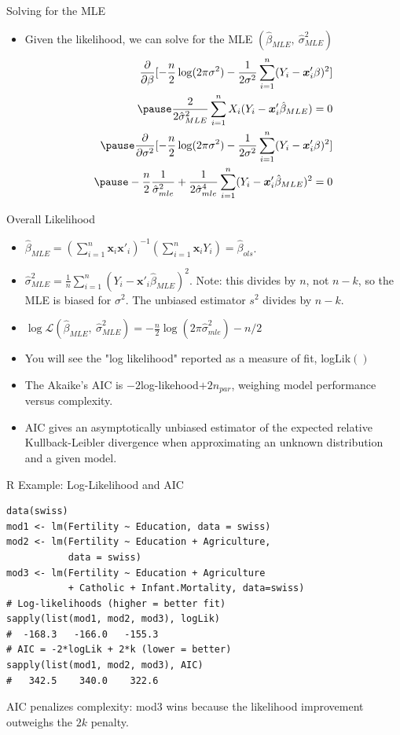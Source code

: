\documentclass[aspectratio=169, handout, t]{beamer}
\numberwithin{equation}{section}
\begin{document}
\begin{frame}{Solving for the MLE}
\begin{itemize}
\item Given the likelihood, we can solve for the MLE $(\hat{\beta}_{MLE},\ \hat{\sigma}^2_{MLE})$
\begin{align*}
\frac{\partial}{\partial \beta}[-\frac{n}{2}\log(2\pi\sigma^2)-\frac{1}{2\sigma^2}\sum_{i=1}^n(Y_i-\bm{x}_i'\beta)^2]\\\pause
\frac{2}{2\hat{\sigma}_{MLE}^2}\sum_{i=1}^nX_i(Y_i-\bm{x}_i'\hat{\beta}_{MLE})=0\\\pause
\frac{\partial}{\partial \sigma^2}[-\frac{n}{2}\log(2\pi\sigma^2)-\frac{1}{2\sigma^2}\sum_{i=1}^n(Y_i-\bm{x}_i'\beta)^2]\\\pause
-\frac{n}{2}\frac{1}{\hat{\sigma}_{mle}^2}+\frac{1}{2\hat{\sigma}_{mle}^4}\sum_{i=1}^n(Y_i-\bm{x}_i'\hat{\beta}_{MLE})^2=0
\end{align*}
\end{itemize}
\end{frame}

\begin{frame}{Overall Likelihood}
\begin{itemize}
\item $\hat{\beta}_{MLE}=(\sum_{i=1}^n\bm{x}_i\bm{x}'_i)^{-1}(\sum_{i=1}^n\bm{x}_iY_i)=\hat{\beta}_{ols}$.\pause
\item $\hat{\sigma}^2_{MLE}=\frac{1}{n}\sum_{i=1}^n(Y_i-\bm{x}'_i\hat{\beta}_{MLE})^{2}$.  Note: this divides by $n$, not $n{-}k$, so the MLE is \alert{biased} for $\sigma^2$.  The unbiased estimator $s^2$ divides by $n{-}k$.\pause
\item $\log\mathcal{L}(\hat{\beta}_{MLE},\ \hat{\sigma}^2_{MLE})=-\frac{n}{2}\log(2\pi \hat{\sigma}^2_{mle})-n/2$\pause
\item You will see the "log likelihood" reported as a measure of fit, logLik$()$\pause
\item The Akaike's AIC is $-2$log-likehood$+2n_{par}$, weighing model performance versus complexity.\pause
\item AIC gives an asymptotically unbiased estimator of the expected relative Kullback-Leibler divergence when approximating an unknown distribution and a given model.
\end{itemize}
\end{frame}

\begin{frame}[fragile]{R Example: Log-Likelihood and AIC}
\begin{lstlisting}[style=Rstyle]
data(swiss)
mod1 <- lm(Fertility ~ Education, data = swiss)
mod2 <- lm(Fertility ~ Education + Agriculture,
           data = swiss)
mod3 <- lm(Fertility ~ Education + Agriculture
           + Catholic + Infant.Mortality, data=swiss)
# Log-likelihoods (higher = better fit)
sapply(list(mod1, mod2, mod3), logLik)
#  -168.3   -166.0   -155.3
# AIC = -2*logLik + 2*k (lower = better)
sapply(list(mod1, mod2, mod3), AIC)
#   342.5    340.0    322.6
\end{lstlisting}
\smallskip
AIC penalizes complexity: mod3 wins because the likelihood improvement outweighs the $2k$ penalty.
\end{frame}
\end{document}
